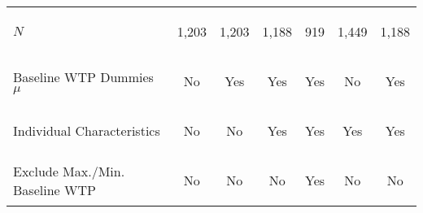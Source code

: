 \begin{center}
\begin{tabular}{lcccccc}
$N$ & \begin{footnotesize}1,203\end{footnotesize} & \begin{footnotesize}1,203\end{footnotesize} & \begin{footnotesize}1,188\end{footnotesize} & \begin{footnotesize}919\end{footnotesize} & \begin{footnotesize}1,449\end{footnotesize} & \begin{footnotesize}1,188\end{footnotesize}\\
\noalign{\smallskip}Baseline WTP Dummies $\mu$ & \begin{footnotesize}No\end{footnotesize} & \begin{footnotesize}Yes\end{footnotesize} & \begin{footnotesize}Yes\end{footnotesize} & \begin{footnotesize}Yes\end{footnotesize} & \begin{footnotesize}No\end{footnotesize} & \begin{footnotesize}Yes\end{footnotesize}\\
Individual Characteristics & \begin{footnotesize}No\end{footnotesize} & \begin{footnotesize}No\end{footnotesize} & \begin{footnotesize}Yes\end{footnotesize} & \begin{footnotesize}Yes\end{footnotesize} & \begin{footnotesize}Yes\end{footnotesize} & \begin{footnotesize}Yes\end{footnotesize}\\
Exclude Max./Min. Baseline WTP & \begin{footnotesize}No\end{footnotesize} & \begin{footnotesize}No\end{footnotesize} & \begin{footnotesize}No\end{footnotesize} & \begin{footnotesize}Yes\end{footnotesize} & \begin{footnotesize}No\end{footnotesize} & \begin{footnotesize}No\end{footnotesize}\\

\end{tabular}
\end{center}
